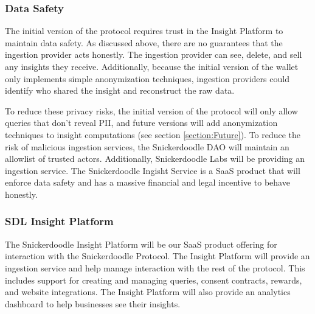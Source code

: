 \subsubsection{Data Safety}
\label{section:IngestionDataSafety}

The initial version of the protocol requires trust in the Insight Platform to maintain data safety. As discussed above, there are no guarantees that the 
ingestion provider acts honestly. The ingestion provider can see, delete, and sell any insights they receive. Additionally, because the initial version 
of the wallet only implements simple anonymization techniques, ingestion providers could identify who shared the insight and reconstruct the raw data. 


To reduce these privacy risks, the initial version of the protocol will only allow queries that don't reveal PII, and future versions will add anonymization 
techniques to insight computations (see section \ref{section:Future}). To reduce the risk of malicious ingestion services, the Snickerdoodle DAO will maintain 
an allowlist of trusted actors. Additionally, Snickerdoodle Labs will be providing an ingestion service. The Snickerdoodle Ingisht Service is a SaaS product 
that will enforce data safety and has a massive financial and legal incentive to behave honestly.

\subsubsection{SDL Insight Platform}
\label{section:InsightService}

The Snickerdoodle Insight Platform will be our SaaS product offering for interaction with the Snickerdoodle Protocol. The Insight Platform will provide an 
ingestion service and help manage interaction with the rest of the protocol. This includes support for creating and managing queries, consent contracts, 
rewards, and website integrations. The Insight Platform will also provide an analytics dashboard to help businesses see their insights.